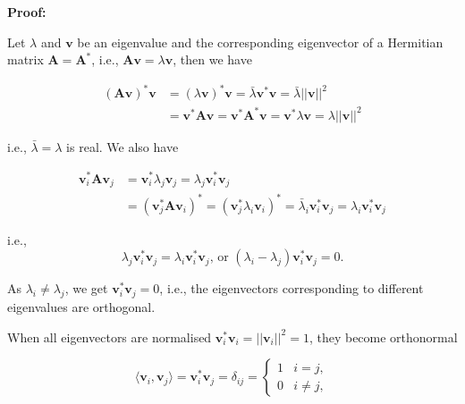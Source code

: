 \documentclass[10pt,b5paper,titlepage]{book}
\begin{document}
\begin{itemize}
\textbf{Proof:}

Let $\lambda$ and $\mathbf{v}$ be an eigenvalue and the corresponding eigenvector of a Hermitian matrix $\mathbf{A} = \mathbf{A}^{*}$, i.e., $\mathbf{A}\mathbf{v} = \lambda\mathbf{v}$, then we have

\begin{equation}
\begin{array}{ll}
(\mathbf{A}\mathbf{v})^{*}\mathbf{v} & = (\lambda\mathbf{v})^{*}\mathbf{v} = \bar{\lambda}\mathbf{v}^{*}\mathbf{v} = \bar{\lambda}||\mathbf{v}||^{2}\\
& = \mathbf{v}^{*}\mathbf{A}\mathbf{v} = \mathbf{v}^{*}\mathbf{A}^{*}\mathbf{v} = \mathbf{v}^{*}\lambda\mathbf{v} = \lambda||\mathbf{v}||^{2}
\end{array}
\end{equation}

i.e., $\bar{\lambda} = \lambda$ is real. We also have

\begin{equation}
\begin{array}{ll}
\mathbf{v}_{i}^{*}\mathbf{A}\mathbf{v}_{j} & = \mathbf{v}_{i}^{*}\lambda_{j}\mathbf{v}_{j} = \lambda_{j}\mathbf{v}_{i}^{*}\mathbf{v}_{j}\\
& = (\mathbf{v}_{j}^{*}\mathbf{A}\mathbf{v}_{i})^{*} = (\mathbf{v}_{j}^{*}\lambda_{i}\mathbf{v}_{i})^{*} = \bar{\lambda}_{i}\mathbf{v}_{i}^{*}\mathbf{v}_{j} = \lambda_{i}\mathbf{v}_{i}^{*}\mathbf{v}_{j}
\end{array}
\end{equation}

i.e.,
\begin{equation}
\lambda_{j}\mathbf{v}_{i}^{*}\mathbf{v}_{j} = \lambda_{i}\mathbf{v}_{i}^{*}\mathbf{v}_{j}
\text{, or }
(\lambda_{i}-\lambda_{j})\mathbf{v}_{i}^{*}\mathbf{v}_{j} = 0
.\end{equation}

As $\lambda_{i} \neq \lambda_{j}$, we get $\mathbf{v}_{i}^{*}\mathbf{v}_{j} = 0$, i.e., the eigenvectors corresponding to different eigenvalues are orthogonal.

When all eigenvectors are normalised $\mathbf{v}_{i}^{*}\mathbf{v}_{i} = ||\mathbf{v}_{i}||^{2} = 1$, they become orthonormal

\begin{equation}
\langle{\mathbf{v}_{i},\mathbf{v}_{j}}\rangle = \mathbf{v}_{i}^{*}\mathbf{v}_{j} = \delta_{ij} = 
\left \{
\begin{array}{ll}
1 & i = j,\\
0 & i \neq j,
\end{array} \right
.\end{equation}


\end{itemize}
\end{document}
